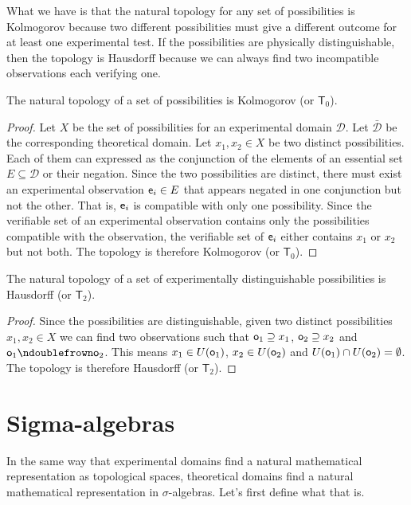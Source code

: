\documentclass[11pt,letterpaper,fleqn]{memoir} %
\begin{document}
What we have is that the natural topology for any set of possibilities is Kolmogorov because two different possibilities must give a different outcome for at least one experimental test. If the possibilities are physically distinguishable, then the topology is Hausdorff because we can always find two incompatible observations each verifying one.

\begin{mathSection}
	\begin{prop}
	The natural topology of a set of possibilities is Kolmogorov (or $\mathsf{T}_0$).
\end{prop}
\begin{proof}
	Let $X$ be the set of possibilities for an experimental domain $\mathcal{D}$. Let $\bar{\mathcal{D}}$ be the corresponding theoretical domain. Let $x_1, x_2 \in X$ be two distinct possibilities. Each of them can expressed as the conjunction of the elements of an essential set $E \subseteq \mathcal{D}$ or their negation. Since the two possibilities are distinct, there must exist an experimental observation $\obs[e]_i \in E$ that appears negated in one conjunction but not the other. That is, $\obs[e]_i$ is compatible with only one possibility. Since the verifiable set of an experimental observation contains only the possibilities compatible with the observation, the verifiable set of $\obs[e]_i$ either contains $x_1$ or $x_2$ but not both. The topology is therefore Kolmogorov (or $\mathsf{T}_0$).
\end{proof}
	\begin{prop}
	The natural topology of a set of experimentally distinguishable possibilities is Hausdorff (or $\mathsf{T}_2$).
\end{prop}
\begin{proof}
	Since the possibilities are distinguishable, given two distinct possibilities $x_1, x_2 \in X$ we can find two observations such that $\obs_1 \broader x_1$, $\obs_2 \broader x_2$ and $\obs_1 \ncomp \obs_2$. This means $x_1 \in U(\obs_1)$, $x_2 \in U(\obs_2)$ and $U(\obs_1) \cap U(\obs_2) = \emptyset$. The topology is therefore Hausdorff (or $\mathsf{T}_2$).
\end{proof}
\end{mathSection}

\section{Sigma-algebras}

In the same way that experimental domains find a natural mathematical representation as topological spaces, theoretical domains find a natural mathematical representation in $\sigma$-algebras. Let's first define what that is.
\end{document}
